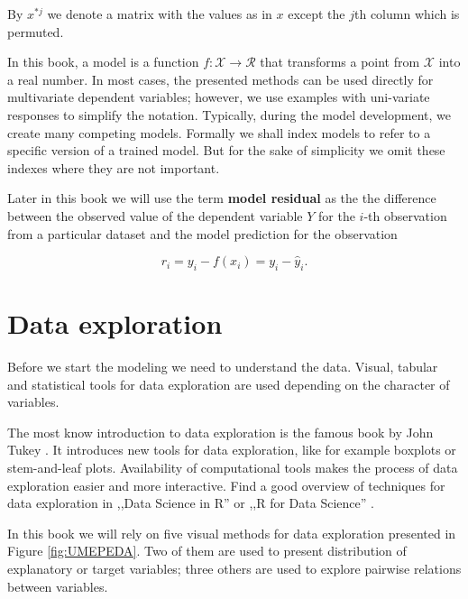 \documentclass[]{krantz}
\begin{document}
By \(x^{*j}\) we denote a matrix with the values as in \(x\) except the \(j\)th column which is permuted.

In this book, a model is a function \(f:\mathcal X \rightarrow \mathcal R\) that transforms a point from \(\mathcal X\) into a real number. In most cases, the presented methods can be used directly for multivariate dependent variables; however, we use examples with uni-variate responses to simplify the notation.
Typically, during the model development, we create many competing models. Formally we shall index models to refer to a specific version of a trained model. But for the sake of simplicity we omit these indexes where they are not important.

Later in this book we will use the term \textbf{model residual} as the the difference between the observed value of the dependent variable \(Y\) for the \(i\)-th observation from a particular dataset and the model prediction for the observation

\begin{equation}
r_i = y_i - f(x_i) = y_i - \hat y_i.
\label{eq:modelResiduals}
\end{equation}

\hypertarget{data-exploration}{%
\section{Data exploration}\label{data-exploration}}

Before we start the modeling we need to understand the data.
Visual, tabular and statistical tools for data exploration are used depending on the character of variables.

The most know introduction to data exploration is the famous book by John Tukey \citep{tukey1977}. It introduces new tools for data exploration, like for example boxplots or stem-and-leaf plots. Availability of computational tools makes the process of data exploration easier and more interactive. Find a good overview of techniques for data exploration in ,,Data Science in R'' \citep{Nolan2015} or ,,R for Data Science'' \citep{Wickham2017}.

In this book we will rely on five visual methods for data exploration presented in Figure \ref{fig:UMEPEDA}. Two of them are used to present distribution of explanatory or target variables; three others are used to explore pairwise relations between variables.
\end{document}

